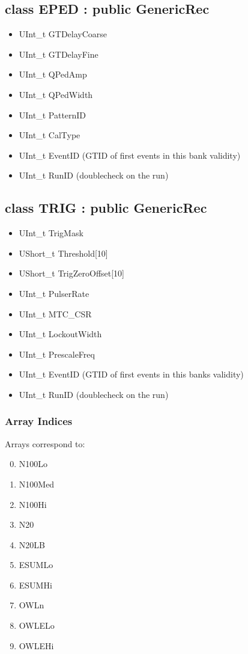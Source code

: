 \documentclass{article}
\begin{document}
\subsection{class EPED : public GenericRec}
\begin{itemize}
\item UInt\_t GTDelayCoarse
\item UInt\_t GTDelayFine
\item UInt\_t QPedAmp
\item UInt\_t QPedWidth
\item UInt\_t PatternID
\item UInt\_t CalType
\item UInt\_t EventID (GTID of first events in this bank validity)
\item UInt\_t RunID (doublecheck on the run)
\end{itemize}

\subsection{class TRIG : public GenericRec}
\begin{itemize}
\item UInt\_t TrigMask
\item UShort\_t Threshold[10]
\item UShort\_t TrigZeroOffset[10]
\item UInt\_t PulserRate
\item UInt\_t MTC\_CSR
\item UInt\_t LockoutWidth
\item UInt\_t PrescaleFreq
\item UInt\_t EventID (GTID of first events in this banks validity)
\item UInt\_t RunID (doublecheck on the run)
\end{itemize}

\subsubsection{Array Indices}
Arrays correspond to:
\begin{enumerate}
\setcounter{enumi}{-1}
\item N100Lo
\item N100Med
\item N100Hi
\item N20
\item N20LB
\item ESUMLo
\item ESUMHi
\item OWLn
\item OWLELo
\item OWLEHi
\end{enumerate}
\end{document}
